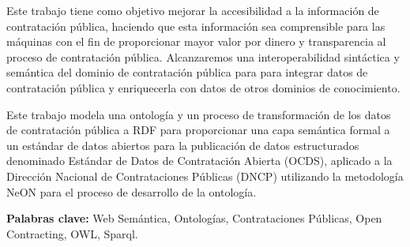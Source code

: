 \begin{resumen}

Este trabajo tiene como objetivo mejorar la accesibilidad a la información de contratación pública, haciendo que esta información sea comprensible para las máquinas con el fin de proporcionar mayor valor por dinero y transparencia al proceso de contratación pública. Alcanzaremos una interoperabilidad sintáctica y semántica del dominio de contratación pública para para integrar datos de contratación pública y enriquecerla con datos de otros dominios de conocimiento.

Este trabajo modela una ontología y un proceso de transformación de los datos de contratación pública a RDF para proporcionar una capa semántica formal a un estándar de datos abiertos para la publicación de datos estructurados denominado Estándar de Datos de Contratación Abierta (OCDS), aplicado a la Dirección Nacional de Contrataciones Públicas (DNCP) utilizando la metodología NeON para el proceso de desarrollo de la ontología.
    
\textbf{Palabras clave:} Web Semántica,  Ontologías, Contrataciones Públicas, Open Contracting, OWL, Sparql.
\end{resumen}


